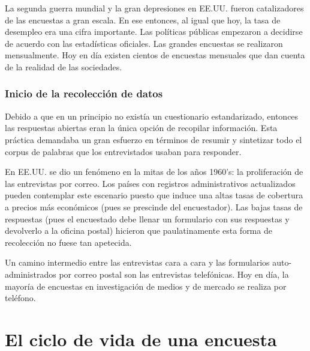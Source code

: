 \documentclass[
  10pt,
  spanish,
]{book}
\begin{document}
La segunda guerra mundial y la gran depresiones en EE.UU. fueron catalizadores de las encuestas a gran escala. En ese entonces, al igual que hoy, la tasa de desempleo era una cifra importante. Las políticas públicas empezaron a decidirse de acuerdo con las estadísticas oficiales. Las grandes encuestas se realizaron mensualmente. Hoy en día existen cientos de encuestas mensuales que dan cuenta de la realidad de las sociedades.

\hypertarget{inicio-de-la-recolecciuxf3n-de-datos}{%
\subsubsection*{Inicio de la recolección de datos}\label{inicio-de-la-recolecciuxf3n-de-datos}}

Debido a que en un principio no existía un cuestionario estandarizado, entonces las respuestas abiertas eran la única opción de recopilar información. Esta práctica demandaba un gran esfuerzo en términos de resumir y sintetizar todo el corpus de palabras que los entrevistados usaban para responder.

En EE.UU. se dio un fenómeno en la mitas de los años 1960's: la proliferación de las entrevistas por correo. Los países con registros administrativos actualizados pueden contemplar este escenario puesto que induce una altas tasas de cobertura a precios más económicos (pues se prescinde del encuestador). Las bajas tasas de respuestas (pues el encuestado debe llenar un formulario con sus respuestas y devolverlo a la oficina postal) hicieron que paulatinamente esta forma de recolección no fuese tan apetecida.

Un camino intermedio entre las entrevistas cara a cara y las formularios auto-administrados por correo postal son las entrevistas telefónicas. Hoy en día, la mayoría de encuestas en investigación de medios y de mercado se realiza por teléfono.

\hypertarget{el-ciclo-de-vida-de-una-encuesta}{%
\section{El ciclo de vida de una encuesta}\label{el-ciclo-de-vida-de-una-encuesta}}
\end{document}
